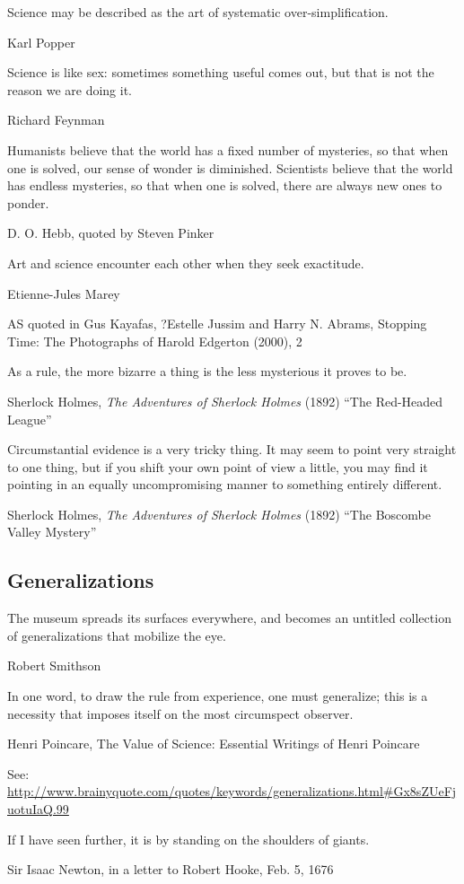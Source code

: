\epigraph{Science may be described as the art of systematic over-simplification.}{Karl Popper}

\epigraph{Science is like sex: sometimes something useful comes out, but that is not the reason we are doing it.}{Richard Feynman}

\epigraph{Humanists believe that the world has a fixed number of mysteries, so that when one is solved, our sense of wonder is diminished.  Scientists believe that the world has endless mysteries, so that when one is solved, there are always new ones to ponder.}{D. O. Hebb, quoted by Steven Pinker}

\epigraph{Art and science encounter each other when they seek exactitude.}{Etienne-Jules Marey}

AS quoted in Gus Kayafas, ?Estelle Jussim and Harry N. Abrams, Stopping Time: The Photographs of Harold Edgerton (2000), 2

\epigraph{As a rule, the more bizarre a thing is the less mysterious it proves to be.}{Sherlock Holmes,  \emph{The Adventures of Sherlock Holmes} (1892) ``The Red-Headed League''}

\epigraph{Circumstantial evidence is a very tricky thing. It may seem to point very straight to one thing, but if you shift your own point of view a little, you may find it pointing in an equally uncompromising manner to something entirely different.}{Sherlock Holmes, \emph{The Adventures of Sherlock Holmes} (1892) ``The Boscombe Valley Mystery''}
	

\subsection{Generalizations}
\epigraph{The museum spreads its surfaces everywhere, and becomes an untitled collection of generalizations that mobilize the eye.}{Robert Smithson}

\epigraph{In one word, to draw the rule from experience, one must generalize; this is a necessity that imposes itself on the most circumspect observer.}{Henri Poincare, The Value of Science: Essential Writings of Henri Poincare}


See: \url{http://www.brainyquote.com/quotes/keywords/generalizations.html#Gx8sZUeFjuotuIaQ.99}

\epigraph{If I have seen further, it is by standing on the shoulders of giants.}{Sir Isaac Newton, in a letter to Robert Hooke, Feb. 5, 1676}

